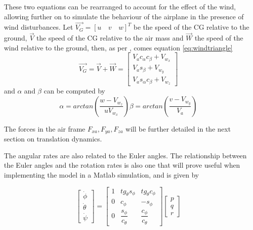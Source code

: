 These two equations can be rearranged to account for the effect of the wind, allowing further on to simulate the behaviour of the airplane in the presence of wind disturbances. Let $\vec{V_G} = [u \quad v \quad w]^T$ be the speed of the CG relative to the ground, $\vec{V}$ the speed of the CG relative to the air mass and $\vec{W}$ the speed of the wind relative to the ground, then, as per \cite{Etkin+Reid}, comes equation \ref{eq:windtriangle}
\begin{equation}
\vec{V_G} = \vec{V} + \vec{W} = 
\begin{bmatrix}
V_ac_\alpha c_\beta + V_{w_x}\\
V_as_\beta+V_{w_y}\\
V_as_\alpha c_\beta + V_{w_z}
\end{bmatrix}
\label{eq:windtriangle}
\end{equation}
and $\alpha$ and $\beta$ can be computed by 
\begin{subequations}
	\begin{equation}
		\alpha = arctan\left(\dfrac{w-V_{w_z}}{uV_{w_x}}\right)
		\label{eq:alpha}
	\end{equation}
	\begin{equation}
		\beta = arctan\left(\dfrac{v-V_{w_y}}{V_a}\right)
		\label{eq:beta}
	\end{equation}
\end{subequations}

The forces in the air frame $F_{xa}, F_{ya}, F_{za}$ will be further detailed in the next section on translation dynamics. 

The angular rates are also related to the Euler angles. The relationship between the Euler angles and the rotation rates is also one that will prove useful when implementing the model in a Matlab simulation, and is given by

\begin{equation}
\begin{bmatrix}
\dot{\phi}\\
\dot{\theta}\\
\dot{\psi}
\end{bmatrix}
=
\begin{bmatrix}
1 & tg_\theta s_\phi & tg_\theta c_\phi\\
0 & c_\phi & -s_\phi\\
0 & \dfrac{s_\phi}{c_\theta} & \dfrac{c_\phi}{c_\theta}
\end{bmatrix}
\begin{bmatrix}
p\\
q\\
r
\end{bmatrix}
\label{eq:euler2omega}
\end{equation}

